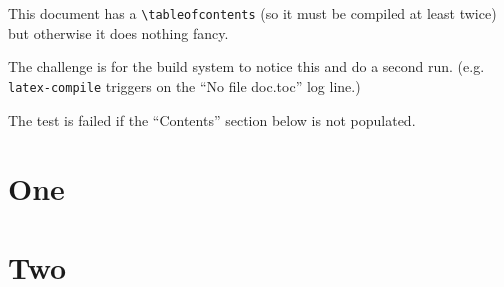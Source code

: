 \documentclass{article}
\begin{document}
This document has a \verb+\tableofcontents+ (so it must be compiled at
least twice) but otherwise it does nothing fancy.
\bigskip

The challenge is for the build system to notice this and do a second run.
(e.g. \verb+latex-compile+ triggers on the ``No file doc.toc'' log line.)
\bigskip

The test is failed if the ``Contents'' section below is not populated.
\tableofcontents

\section{One}

\section{Two}
\end{document}
